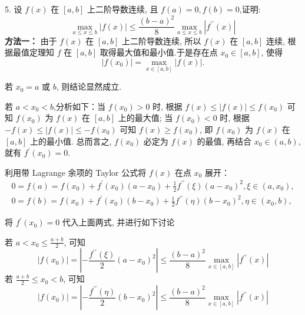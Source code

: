 \begin{tcolorbox}[breakable,enhanced,arc=0mm,outer arc=0mm,
		boxrule=0pt,toprule=1pt,leftrule=0pt,bottomrule=1pt, rightrule=0pt,left=0.2cm,right=0.2cm,
		titlerule=0.5em,toptitle=0.1cm,bottomtitle=-0.1cm,top=0.2cm,
		colframe=white!10!biru,colback=white!90!biru,coltitle=white,
            coltext=black,title =2024-03-10, title style={white!10!biru}, before skip=8pt, after skip=8pt,before upper=\hspace{2em},
		fonttitle=\bfseries,fontupper=\normalsize]
  
5. 设 $ {f}({x}) $ 在 $ [{a}, {b}] $ 上二阶导数连续, 且 $ {f}({a})=0, {f}({b})=0 $,证明:
$$
\max _{a \leqslant x \leqslant b}|f(x)| \leqslant \frac{(b-a)^{2}}{8} \max _{a \leqslant x \leqslant b}\left|f^{\prime \prime}(x)\right|
$$
 \tcblower
\textbf{方法一：}
由于 $ f(x) $ 在 $ [a, b] $ 上二阶导数连续, 所以 $ f(x) $ 在 $ [a, b] $ 连续, 根据最值定理知 $f$ 在 $ [a, b] $ 取得最大值和最小值.于是存在点 $ x_0 \in[a, b] $, 使得
$$
|f(x_0)|=\max _{x \in[a, b]}|f(x)| .
$$

  若 $ x_{0}=a $ 或 $ b $, 则结论显然成立. 
 
 若 $ a<x_{0}<b $,分析如下：当 $ f(x_0)>0 $ 时, 根据 $ f(x) \leq|f(x)| \leq f(x_0) $ 可知 $ f(x_0) $ 为 $ f(x) $ 在 $ [a, b] $ 上的最大值; 当 $ f(x_0)<0 $ 时, 根据 $ -f(x) \leq|f(x)| \leq-f(x_0) $ 可知 $ f(x) \geq f(x_0) $, 即 $ f(x_0) $ 为 $ f(x) $ 在 $ [a, b] $ 上的最小值. 总而言之, $ f(x_0) $ 必定为 $ f(x) $ 的最值, 再结合 $ x_0 \in(a, b) $, 就有 $ f^{\prime}(x_0)=0 $.
 
 利用带 Lagrange 余项的 Taylor 公式将 $ f(x) $ 在点 $ x_{0} $ 展开：
$$
\begin{array}{l}
0=f(a)=f\left(x_{0}\right)+f^{\prime}\left(x_{0}\right)\left(a-x_{0}\right)+\frac{1}{2} f^{\prime \prime}(\xi)\left(a-x_{0}\right)^{2}, \xi \in\left(a, x_{0}\right), \\
0=f(b)=f\left(x_{0}\right)+f^{\prime}\left(x_{0}\right)\left(b-x_{0}\right)+\frac{1}{2} f^{\prime \prime}(\eta)\left(b-x_{0}\right)^{2}, \eta \in\left(x_{0}, b\right),
\end{array}
$$

将 $f^{\prime}\left(x_{0}\right)=0 $ 代入上面两式, 并进行如下讨论

若 $ a<x_0 \leq \frac{a+b}{2} $, 可知 $$ |f(x_0)|=\left|-\frac{f^{\prime \prime}(\xi)}{2}(a-x_0)^{2}\right| \leq \frac{(b-a)^{2}}{8} \max _{x \in[a, b]}\left|f^{\prime \prime}(x)\right| $$
若 $ \frac{a+b}{2} \leq x_0<b $, 可知 $$ |f(x_0)|=\left|-\frac{f^{\prime \prime}(\eta)}{2}(b-x_0)^{2}\right| \leq \frac{(b-a)^{2}}{8} \max _{x \in[a, b]}\left|f^{\prime \prime}(x)\right| $$


\end{tcolorbox}
